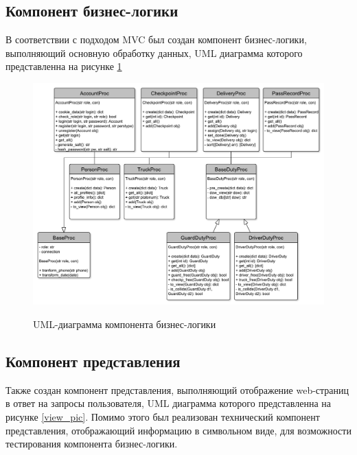 \newpage
\subsection{Компонент бизнес-логики}
В соответствии с подходом MVC был создан компонент бизнес-логики, выполняющий основную обработку данных, UML диаграмма которого представленна на рисунке \ref{model_pic}

\begin{figure}[h!] 
	\begin{center}
		{\includegraphics[scale=0.5, angle=0]{uml/business_models.pdf}}
		\caption{UML-диаграмма компонента бизнес-логики}
		\label{model_pic}
	\end{center}
\end{figure}

\newpage
\subsection{Компонент представления}
Также создан компонент представления, выполняющий отображение web-страниц в ответ на запросы пользователя, UML диаграмма которого представленна на рисунке \ref{view_pic}. Помимо этого был реализован технический компонент представления, отображающий информацию в символьном виде, для возможности тестирования компонента бизнес-логики.

